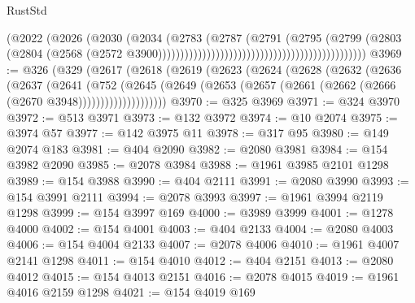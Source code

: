 \begin{lexlean}{RustStd}
\begin{coremodule}
                                                                        (@2022
                                                                          (@2026
                                                                            (@2030
                                                                              (@2034
                                                                                (@2783
                                                                                  (@2787
                                                                                    (@2791
                                                                                      (@2795
                                                                                        (@2799
                                                                                          (@2803
                                                                                            (@2804
                                                                                              (@2568
                                                                                                (@2572
                                                                                                  @3900)))))))))))))))))))))))))))))))))))))))))))))))
@3969 := @326
    (@329
      (@2617
        (@2618
          (@2619
            (@2623
              (@2624
                (@2628
                  (@2632
                    (@2636
                      (@2637
                        (@2641
                          (@752
                            (@2645
                              (@2649
                                (@2653 (@2657 (@2661 (@2662 (@2666 (@2670 @3948))))))))))))))))))))
@3970 := @325 @3969
@3971 := @324 @3970
@3972 := @513 @3971
@3973 := @132 @3972
@3974 := @10 @2074
@3975 := @3974 @57
@3977 := @142 @3975 @11
@3978 := @317 @95
@3980 := @149 @2074 @183
@3981 := @404 @2090
@3982 := @2080 @3981
@3984 := @154 @3982 @2090
@3985 := @2078 @3984
@3988 := @1961 @3985 @2101 @1298
@3989 := @154 @3988
@3990 := @404 @2111
@3991 := @2080 @3990
@3993 := @154 @3991 @2111
@3994 := @2078 @3993
@3997 := @1961 @3994 @2119 @1298
@3999 := @154 @3997 @169
@4000 := @3989 @3999
@4001 := @1278 @4000
@4002 := @154 @4001
@4003 := @404 @2133
@4004 := @2080 @4003
@4006 := @154 @4004 @2133
@4007 := @2078 @4006
@4010 := @1961 @4007 @2141 @1298
@4011 := @154 @4010
@4012 := @404 @2151
@4013 := @2080 @4012
@4015 := @154 @4013 @2151
@4016 := @2078 @4015
@4019 := @1961 @4016 @2159 @1298
@4021 := @154 @4019 @169

\end{coremodule}
\end{lexlean}

